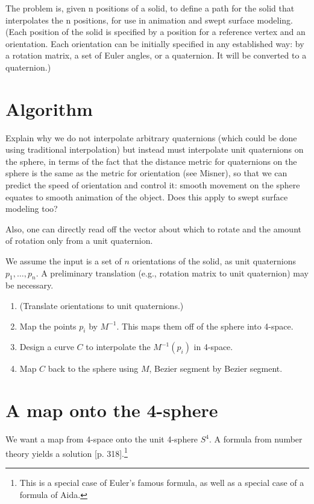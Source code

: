 The problem is, given n positions of a solid, to define
a path for the solid that interpolates the n positions,
for use in animation and swept surface modeling.
(Each position of the solid is specified by a position for a reference
vertex and an orientation.
Each orientation can be initially specified in any established way: 
by a rotation matrix, a set of Euler angles, or a quaternion.
It will be converted to a quaternion.)

\section{Algorithm}

\begin{rmk}
Explain why we do not interpolate arbitrary quaternions (which could
be done using traditional interpolation) but instead must interpolate
unit quaternions on the sphere,
in terms of the fact that the distance metric for quaternions on the sphere
is the same as the metric for orientation (see Misner), so that we can predict 
the speed of orientation and control it: smooth movement on the sphere
equates to smooth animation of the object.  Does this apply to swept
surface modeling too?

Also, one can directly read off the vector about which to rotate and the 
amount of rotation only from a unit quaternion.
\end{rmk}

We assume the input is a set of $n$ orientations of the solid, as unit
quaternions $p_1,\ldots,p_n$.
A preliminary translation (e.g., rotation matrix to unit quaternion)
may be necessary.

\begin{enumerate}
\item
	(Translate orientations to unit quaternions.)
\item
	Map the points $p_i$ by $M^{-1}$.
	This maps them off of the sphere into 4-space.
\item
	Design a curve $C$ to interpolate the $M^{-1}(p_i)$ in 4-space.
\item
	Map $C$ back to the sphere using $M$, Bezier segment by Bezier segment.
\end{enumerate}

\section{A map onto the 4-sphere}

We want a map from 4-space onto the unit 4-sphere $S^4$.
A formula from number theory yields a solution
\cite{Dickson52}[p. 318].\footnote{This is a special case of
	Euler's famous formula, as well as a special case of a formula of Aida.}

